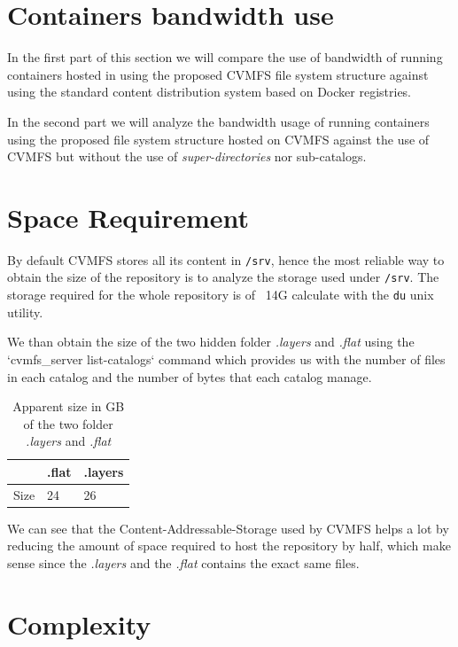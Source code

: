 \section{Containers bandwidth use}

In the first part of this section we will compare the use of bandwidth of
running containers hosted in using the proposed CVMFS file system structure
against using the standard content distribution system based on Docker
registries.

In the second part we will analyze the bandwidth usage of running containers
using the proposed file system structure hosted on CVMFS against the use of CVMFS but without the use of \textit{super-directories} nor sub-catalogs.

\section{Space Requirement}

By default CVMFS stores all its content in \texttt{/srv}, hence the most
reliable way to obtain the size of the repository is to analyze the storage
used under \texttt{/srv}. The storage required for the whole repository is of
~14G calculate with the \texttt{du} unix utility.

We than obtain the size of the two hidden folder \textit{.layers} and
\textit{.flat} using the `cvmfs\_server list-catalogs` command which provides us
with the number of files in each catalog and the number of bytes that each
catalog manage.

\begin{table}[]
\begin{tabular}{|l|ll|}
\hline
     & .flat & .layers \\ \hline
Size & 24    & 26      \\ \hline
\end{tabular}
\caption{Apparent size in GB of the two folder \textit{.layers} and \textit{.flat}}
\label{tab:size-of-repo}
\end{table}

We can see that the Content-Addressable-Storage used by CVMFS helps a lot by
reducing the amount of space required to host the repository by half, which
make sense since the \textit{.layers} and the \textit{.flat} contains the exact
same files.

\section{Complexity}

